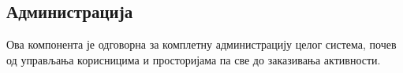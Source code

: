 \documentclass[a4paper, 12pt, diplomski]{etfcyr}
\begin{document}
             \subsection{Администрација}
                 \begin{justify}
                     Ова компонента је одговорна за комплетну администрацију целог система, почев од управљања корисницима и просторијама па све до заказивања активности.
                 \end{justify}
\end{document}

